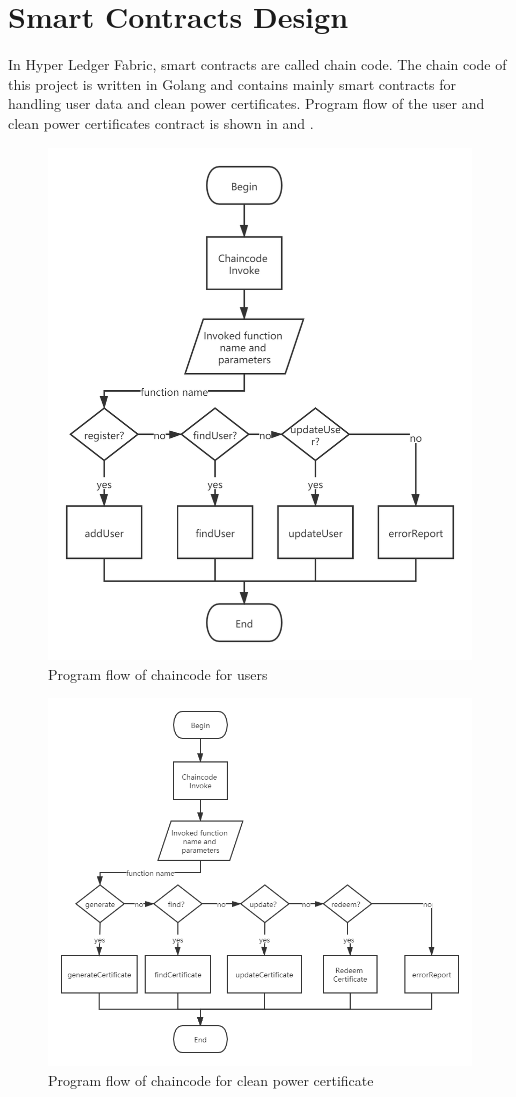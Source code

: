 \section{Smart Contracts Design}


In Hyper Ledger Fabric, smart contracts are called chain code. The chain code of this project is written in Golang and contains mainly smart contracts for handling user data and clean power certificates. Program flow of the user and clean power certificates contract is shown in  and .
\begin{figure}[H]
    \centering
    \includegraphics[width=.5 \textwidth]{img/flowUser.png}
    \caption{Program flow of chaincode for users}
    \label{fig:flowUser}
\end{figure}

\begin{figure}[H]
    \centering
    \includegraphics[width=.6 \textwidth]{img/flowCert.png}
    \caption{Program flow of chaincode for clean power certificate}
    \label{fig:flowCert}
\end{figure}

